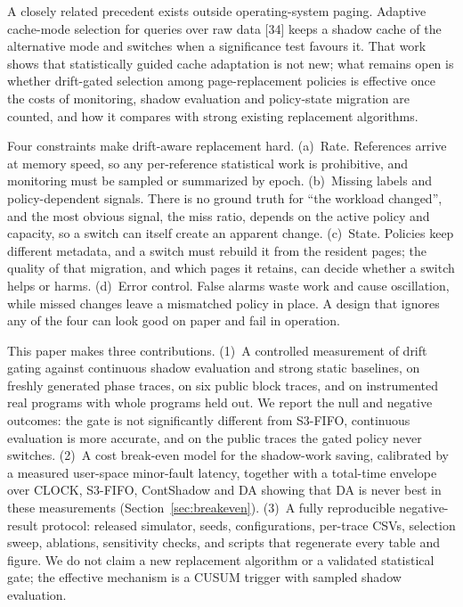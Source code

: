 \documentclass[10pt,twocolumn,a4paper]{IEEEtran}
\begin{document}
A closely related precedent exists outside operating-system paging. Adaptive
cache-mode selection for queries over raw data [34] keeps a shadow cache of the
alternative mode and switches when a significance test favours it. That work
shows that statistically guided cache adaptation is not new; what remains open
is whether drift-gated selection among page-replacement policies is effective
once the costs of monitoring, shadow evaluation and policy-state migration are
counted, and how it compares with strong existing replacement algorithms.

Four constraints make drift-aware replacement hard. (a)~Rate. References
arrive at memory speed, so any per-reference statistical work is prohibitive,
and monitoring must be sampled or summarized by epoch. (b)~Missing labels and
policy-dependent signals. There is no ground truth for ``the workload
changed'', and the most obvious signal, the miss ratio, depends on the active
policy and capacity, so a switch can itself create an apparent change.
(c)~State. Policies keep different metadata, and a switch must rebuild it from
the resident pages; the quality of that migration, and which pages it retains,
can decide whether a switch helps or harms. (d)~Error control. False alarms
waste work and cause oscillation, while missed changes leave a mismatched
policy in place. A design that ignores any of the four can look good on paper
and fail in operation.

This paper makes three contributions. (1)~A controlled measurement of drift
gating against continuous shadow evaluation and strong static baselines, on
freshly generated phase traces, on six public block traces, and on
instrumented real programs with whole programs held out. We report the null
and negative outcomes: the gate is not significantly different from S3-FIFO,
continuous evaluation is more accurate, and on the public traces the gated
policy never switches. (2)~A cost break-even model for the shadow-work saving,
calibrated by a measured user-space minor-fault latency, together with a
total-time envelope over CLOCK, S3-FIFO, ContShadow and DA showing that DA is
never best in these measurements (Section~\ref{sec:breakeven}). (3)~A fully reproducible
negative-result protocol: released simulator, seeds, configurations, per-trace
CSVs, selection sweep, ablations, sensitivity checks, and scripts that
regenerate every table and figure. We do not claim a new replacement algorithm
or a validated statistical gate; the effective mechanism is a CUSUM trigger
with sampled shadow evaluation.
\end{document}
